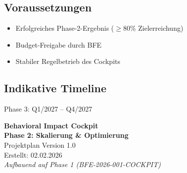 \documentclass[11pt,a4paper]{article}
\begin{document}
\subsection{Voraussetzungen}

\begin{itemize}[leftmargin=*]
    \item Erfolgreiches Phase-2-Ergebnis ($\geq$80\% Zielerreichung)
    \item Budget-Freigabe durch BFE
    \item Stabiler Regelbetrieb des Cockpits
\end{itemize}

\subsection{Indikative Timeline}

Phase 3: Q1/2027 -- Q4/2027

\vspace{2cm}

\begin{center}
\begin{tcolorbox}[colback=fadarkblue!10, colframe=fadarkblue, width=0.8\textwidth]
\centering
\textbf{\Large Behavioral Impact Cockpit}\\[0.5em]
\textbf{Phase 2: Skalierung \& Optimierung}\\[1em]
\small
Projektplan Version 1.0\\
Erstellt: 02.02.2026\\[1em]
\textit{Aufbauend auf Phase 1 (BFE-2026-001-COCKPIT)}
\end{tcolorbox}
\end{center}
\end{document}
